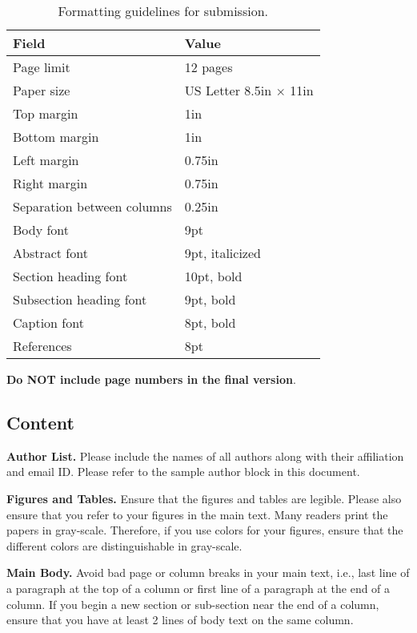 \documentclass[final]{jpaper_micro_2012}
\begin{document}
\begin{table}[h!]
  \centering
  \begin{tabular}{|l|l|}
    \hline
    \textbf{Field} & \textbf{Value}\\
    \hline
    \hline
    Page limit & 12 pages\\
    \hline
    Paper size & US Letter 8.5in $\times$ 11in\\
    \hline
    Top margin & 1in\\
    \hline
    Bottom margin & 1in\\
    \hline
    Left margin & 0.75in\\
    \hline
    Right margin & 0.75in\\
    \hline
    Separation between columns & 0.25in\\
    \hline
    Body font & 9pt\\
    \hline
    Abstract font & 9pt, italicized\\
    \hline
    Section heading font & 10pt, bold\\
    \hline
    Subsection heading font & 9pt, bold\\
    \hline
    Caption font & 8pt, bold\\
    \hline
    References & 8pt\\
    \hline
  \end{tabular}
  \caption{Formatting guidelines for submission.}
  \label{table:formatting}
\end{table}

\textbf{Do NOT include page numbers in the final version}. 

\subsection{Content}

\noindent\textbf{{Author List.}} Please include the names of all
authors along with their affiliation and email ID. Please refer to
the sample author block in this document.

\noindent\textbf{Figures and Tables.} Ensure that the figures and
tables are legible.  Please also ensure that you refer to your
figures in the main text. Many readers print the papers in
gray-scale. Therefore, if you use colors for your figures, ensure
that the different colors are distinguishable in gray-scale.

\noindent\textbf{Main Body.} Avoid bad page or column breaks in
your main text, i.e., last line of a paragraph at the top of a
column or first line of a paragraph at the end of a column. If you
begin a new section or sub-section near the end of a column,
ensure that you have at least 2 lines of body text on the same
column.
\end{document}
